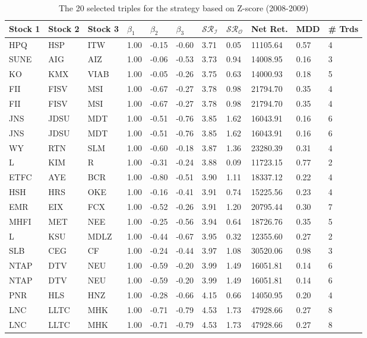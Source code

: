 \documentclass[11pt,a4,twosided,singlespacing,titlepagenumber=on]{scrreprt}
\numberwithin{equation}{chapter} %
\theoremstyle{remark}
\begin{document}
\begin{table}[H]
\centering
\begin{tabular}{lllllllllll}
\hline
Stock 1 & Stock 2 & Stock 3 & $\beta_1$ & $\beta_2$ & $\beta_3$ & $\mathcal{SR}_\mathcal{I}$ & $\mathcal{SR}_\mathcal{O}$ & Net Ret. & MDD & \# Trds\\ \hline
HPQ  & HSP  & ITW  & 1.00 & -0.15 & -0.60 & 3.71 & 0.05 & 11105.64 & 0.57 & 4 \\
SUNE  & AIG  & AIZ  & 1.00 & -0.06 & -0.53 & 3.73 & 0.94 & 14008.95 & 0.16 & 3 \\
KO  & KMX  & VIAB  & 1.00 & -0.05 & -0.26 & 3.75 & 0.63 & 14000.93 & 0.18 & 5 \\
FII  & FISV  & MSI  & 1.00 & -0.67 & -0.27 & 3.78 & 0.98 & 21794.70 & 0.35 & 4 \\
FII  & FISV  & MSI  & 1.00 & -0.67 & -0.27 & 3.78 & 0.98 & 21794.70 & 0.35 & 4 \\
JNS  & JDSU  & MDT  & 1.00 & -0.51 & -0.76 & 3.85 & 1.62 & 16043.91 & 0.16 & 6 \\
JNS  & JDSU  & MDT  & 1.00 & -0.51 & -0.76 & 3.85 & 1.62 & 16043.91 & 0.16 & 6 \\
WY  & RTN  & SLM  & 1.00 & -0.60 & -0.18 & 3.87 & 1.36 & 23280.39 & 0.31 & 4 \\
L  & KIM  & R  & 1.00 & -0.31 & -0.24 & 3.88 & 0.09 & 11723.15 & 0.77 & 2 \\
ETFC  & AYE  & BCR  & 1.00 & -0.80 & -0.51 & 3.90 & 1.11 & 18337.12 & 0.22 & 4 \\
HSH  & HRS  & OKE  & 1.00 & -0.16 & -0.41 & 3.91 & 0.74 & 15225.56 & 0.23 & 4 \\
EMR  & EIX  & FCX  & 1.00 & -0.52 & -0.26 & 3.91 & 1.20 & 20795.44 & 0.30 & 7 \\
MHFI  & MET  & NEE  & 1.00 & -0.25 & -0.56 & 3.94 & 0.64 & 18726.76 & 0.35 & 5 \\
L  & KSU  & MDLZ  & 1.00 & -0.44 & -0.67 & 3.95 & 0.32 & 12355.60 & 0.27 & 2 \\
SLB  & CEG  & CF  & 1.00 & -0.24 & -0.44 & 3.97 & 1.08 & 30520.06 & 0.98 & 3 \\
NTAP  & DTV  & NEU  & 1.00 & -0.59 & -0.20 & 3.99 & 1.49 & 16051.81 & 0.14 & 6 \\
NTAP  & DTV  & NEU  & 1.00 & -0.59 & -0.20 & 3.99 & 1.49 & 16051.81 & 0.14 & 6 \\
PNR  & HLS  & HNZ  & 1.00 & -0.28 & -0.66 & 4.15 & 0.66 & 14050.95 & 0.20 & 4 \\
LNC  & LLTC  & MHK  & 1.00 & -0.71 & -0.79 & 4.53 & 1.73 & 47928.66 & 0.27 & 8 \\
LNC  & LLTC  & MHK  & 1.00 & -0.71 & -0.79 & 4.53 & 1.73 & 47928.66 & 0.27 & 8 \\
\hline
\end{tabular}
\caption{The 20 selected triples for the strategy based on Z-score (2008-2009)}
\label{20_selected_triples_zscore}
\end{table}
\end{document}
